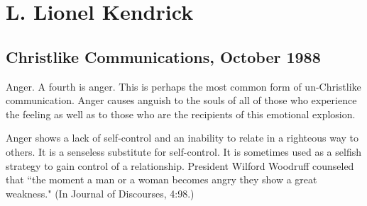 \section{L. Lionel Kendrick}

\subsection{Christlike Communications, October 1988}

Anger. A fourth is anger. This is perhaps the most common form of un-Christlike communication. Anger causes anguish to the souls of all of those who experience the feeling as well as to those who are the recipients of this emotional explosion.

Anger shows a lack of self-control and an inability to relate in a righteous way to others. It is a senseless substitute for self-control. It is sometimes used as a selfish strategy to gain control of a relationship. President Wilford Woodruff counseled that ``the moment a man or a woman becomes angry they show a great weakness." (In Journal of Discourses, 4:98.)
